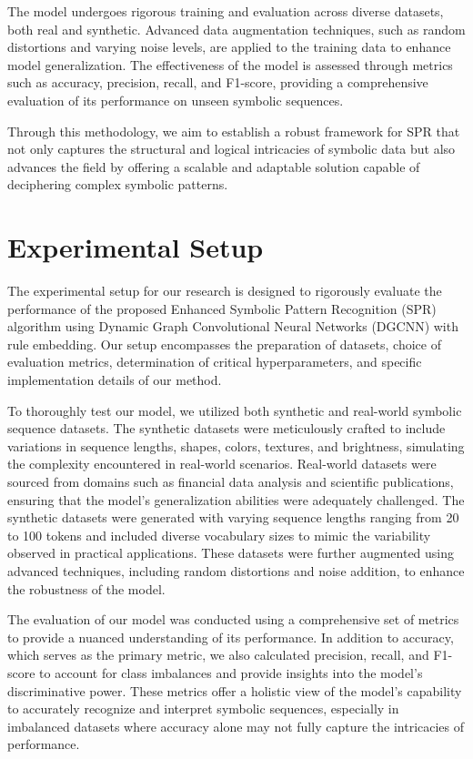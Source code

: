 \documentclass{article}
\begin{document}
The model undergoes rigorous training and evaluation across diverse datasets, both real and synthetic. Advanced data augmentation techniques, such as random distortions and varying noise levels, are applied to the training data to enhance model generalization. The effectiveness of the model is assessed through metrics such as accuracy, precision, recall, and F1-score, providing a comprehensive evaluation of its performance on unseen symbolic sequences.

Through this methodology, we aim to establish a robust framework for SPR that not only captures the structural and logical intricacies of symbolic data but also advances the field by offering a scalable and adaptable solution capable of deciphering complex symbolic patterns.

\section{Experimental Setup}
The experimental setup for our research is designed to rigorously evaluate the performance of the proposed Enhanced Symbolic Pattern Recognition (SPR) algorithm using Dynamic Graph Convolutional Neural Networks (DGCNN) with rule embedding. Our setup encompasses the preparation of datasets, choice of evaluation metrics, determination of critical hyperparameters, and specific implementation details of our method.

To thoroughly test our model, we utilized both synthetic and real-world symbolic sequence datasets. The synthetic datasets were meticulously crafted to include variations in sequence lengths, shapes, colors, textures, and brightness, simulating the complexity encountered in real-world scenarios. Real-world datasets were sourced from domains such as financial data analysis and scientific publications, ensuring that the model's generalization abilities were adequately challenged. The synthetic datasets were generated with varying sequence lengths ranging from 20 to 100 tokens and included diverse vocabulary sizes to mimic the variability observed in practical applications. These datasets were further augmented using advanced techniques, including random distortions and noise addition, to enhance the robustness of the model.

The evaluation of our model was conducted using a comprehensive set of metrics to provide a nuanced understanding of its performance. In addition to accuracy, which serves as the primary metric, we also calculated precision, recall, and F1-score to account for class imbalances and provide insights into the model's discriminative power. These metrics offer a holistic view of the model's capability to accurately recognize and interpret symbolic sequences, especially in imbalanced datasets where accuracy alone may not fully capture the intricacies of performance.
\end{document}

